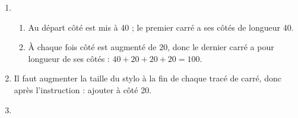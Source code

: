 \begin{enumerate}
		\item %
		\begin{enumerate}
			\item %
Au départ côté est mis à 40 ; le premier carré a ses côtés de longueur 40.
			\item %
À chaque fois côté est augmenté de 20, donc le dernier carré a pour longueur de ses côtés  : $40 + 20 + 20 +20 = 100$.
		\end{enumerate}
	\vspace{5mm}
	\item %
Il faut augmenter la taille du stylo à la fin de chaque tracé de carré, donc après l'instruction : ajouter à côté 20.

	\vspace{5mm}
	
	\item %
	

\end{enumerate}
